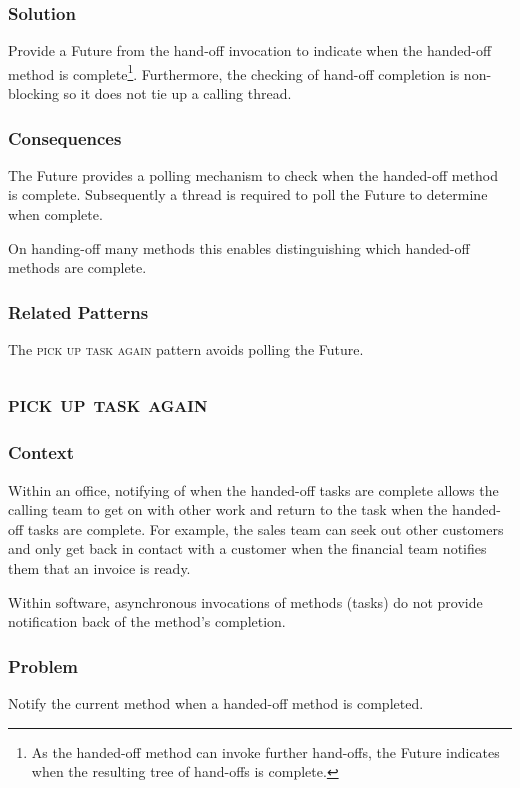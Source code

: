 \documentclass[prodmode]{style/acmlarge}
\begin{document}
\subsubsection*{\textbf{Solution}} Provide a Future from the hand-off invocation to
indicate when the handed-off method is complete\footnote{As the handed-off
method can invoke further hand-offs, the Future indicates when the resulting
tree of hand-offs is complete.}.  Furthermore, the checking of hand-off
completion is non-blocking so it does not tie up a calling thread.

\subsubsection*{Consequences} The Future provides a polling mechanism to check
when the handed-off method is complete.  Subsequently a thread is required to
poll the Future to determine when complete.

On handing-off many methods this enables distinguishing which handed-off methods
are complete.

\subsubsection*{Related Patterns} The \textsc{pick up task again} pattern avoids
polling the Future.



\subsection{\textsc{\textbf{pick up task again}}}

\subsubsection*{Context} Within an office, notifying of when the handed-off tasks
are complete allows the calling team to get on with other work and return to the
task when the handed-off tasks are complete.  For example, the sales team can
seek out other customers and only get back in contact with a customer when the
financial team notifies them that an invoice is ready.

Within software, asynchronous invocations of methods (tasks) do not provide
notification back of the method's completion.

\subsubsection*{\textbf{Problem}} Notify the current method when a handed-off method is
completed.
\end{document}
